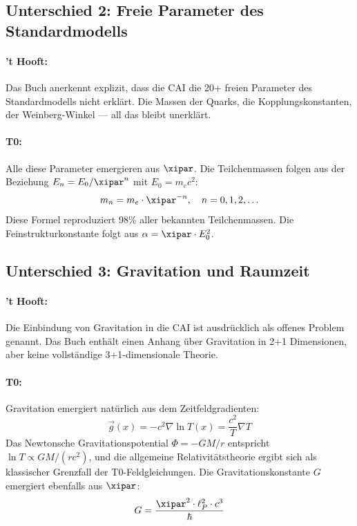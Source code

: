 \subsection{Unterschied 2: Freie Parameter des Standardmodells}

\paragraph{'t Hooft:} Das Buch anerkennt explizit, dass die CAI die 20+ freien
Parameter des Standardmodells nicht erklärt. Die Massen der Quarks, die
Kopplungskonstanten, der Weinberg-Winkel — all das bleibt unerklärt.

\paragraph{T0:} Alle diese Parameter emergieren aus $\xipar$. Die Teilchenmassen
folgen aus der Beziehung $E_n = E_0 / \xipar^n$ mit $E_0 = m_e c^2$:
\begin{equation}
    m_n = m_e \cdot \xipar^{-n}, \quad n = 0, 1, 2, \ldots
    \label{eq:mass_spectrum}
\end{equation}
Diese Formel reproduziert 98\% aller bekannten Teilchenmassen. Die
Feinstrukturkonstante folgt aus $\alpha = \xipar \cdot E_0^2$.

\subsection{Unterschied 3: Gravitation und Raumzeit}

\paragraph{'t Hooft:} Die Einbindung von Gravitation in die CAI ist ausdrücklich
als offenes Problem genannt. Das Buch enthält einen Anhang über Gravitation in
2+1 Dimensionen, aber keine vollständige 3+1-dimensionale Theorie.

\paragraph{T0:} Gravitation emergiert natürlich aus dem Zeitfeldgradienten:
\begin{equation}
    \vec{g}(x) = -c^2 \nabla \ln T(x) = \frac{c^2}{T} \nabla T
    \label{eq:t0_gravity}
\end{equation}
Das Newtonsche Gravitationspotential $\Phi = -GM/r$ entspricht
$\ln T \propto GM/(rc^2)$, und die allgemeine Relativitätstheorie ergibt sich
als klassischer Grenzfall der T0-Feldgleichungen. Die Gravitationskonstante $G$
emergiert ebenfalls aus $\xipar$:
\begin{equation}
    G = \frac{\xipar^2 \cdot \ell_P^2 \cdot c^3}{\hbar}
    \label{eq:G_from_xi}
\end{equation}

